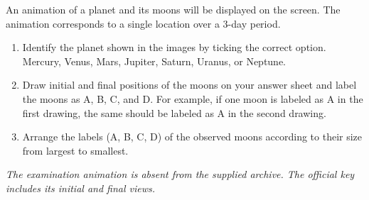 An animation of a planet and its moons will be displayed on the screen. The animation corresponds to a single location over a 3-day period.
\begin{enumerate}
\item Identify the planet shown in the images by ticking the correct option. Mercury, Venus, Mars, Jupiter, Saturn, Uranus, or Neptune.
\item Draw initial and final positions of the moons on your answer sheet and label the moons as A, B, C, and D. For example, if one moon is labeled as A in the first drawing, the same should be labeled as A in the second drawing.
\item Arrange the labels (A, B, C, D) of the observed moons according to their size from largest to smallest.
\end{enumerate}
\textit{The examination animation is absent from the supplied archive. The official key includes its initial and final views.}
